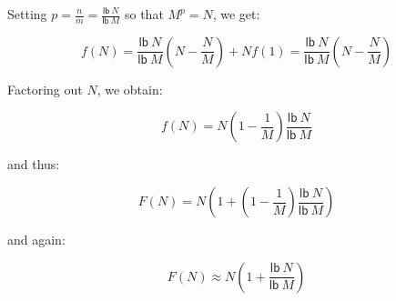 Setting $p = \frac{n}{m} = \frac{\mathsf{lb}~N}{\mathsf{lb}~M}$ so
that $M^p = N$, we get:

\[ f(N) = \frac{\mathsf{lb}~N}{\mathsf{lb}~M}(N - \frac{N}{M}) + Nf(1)
   = \frac{\mathsf{lb}~N}{\mathsf{lb}~M}(N - \frac{N}{M}) \]

Factoring out $N$, we obtain:

\[ f(N) = N(1 - \frac{1}{M})\frac{\mathsf{lb}~N}{\mathsf{lb}~M} \]

and thus:

\[ F(N) = N(1 + (1 - \frac{1}{M})\frac{\mathsf{lb}~N}{\mathsf{lb}~M}) \]

and again:

\[ F(N) \approx N(1 + \frac{\mathsf{lb}~N}{\mathsf{lb}~M}) \]
